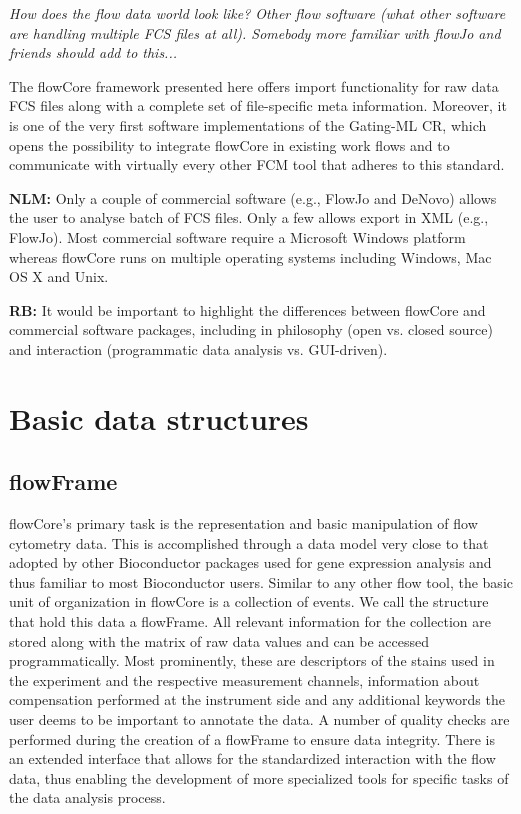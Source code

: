 \documentclass[12pt]{article}
\begin{document}
\textit{How does the flow data world look like? Other flow software
  (what other software are handling multiple FCS files at
  all). Somebody more familiar with flowJo and friends should add to
  this...}

The flowCore framework presented here offers import functionality for
raw data FCS files along with a complete set of file-specific meta information.
Moreover, it is one of the very first software implementations of the Gating-ML CR, 
which opens the possibility to integrate flowCore in existing work flows and to 
communicate with virtually every other FCM tool that adheres to this standard.


{\bf NLM:} Only a couple of commercial software (e.g., FlowJo and
DeNovo) allows the user to analyse batch of FCS files.  Only a few
allows export in XML (e.g., FlowJo). Most commercial software require
a Microsoft Windows platform whereas flowCore runs on multiple
operating systems including Windows, Mac OS X and Unix.


{\bf RB:}  It would be important to highlight
the differences between flowCore and commercial software packages,
including in philosophy (open vs. closed source) and interaction
(programmatic data analysis vs. GUI-driven). 



\section{Basic data structures}
\subsection{flowFrame}
flowCore's primary task is the representation and basic manipulation
of flow cytometry data. This is accomplished through a
data model very close to that adopted by other Bioconductor packages
used for gene expression analysis and thus familiar to most
Bioconductor users. Similar to any other flow tool, the basic unit of
organization in flowCore is a collection of events. We call the
structure that hold this data a flowFrame. All relevant information
for the collection are stored along with the matrix of raw data values
and can be accessed programmatically. Most prominently, these are
descriptors of the stains used in the experiment and the respective
measurement channels, information about compensation performed at the
instrument side and any additional keywords the user deems to be
important to annotate the data. A number of quality checks are
performed during the creation of a flowFrame to ensure data
integrity. There is an extended interface that allows for the
standardized interaction with the flow data, thus enabling the
development of more specialized tools for specific tasks of the data
analysis process.
\end{document}
